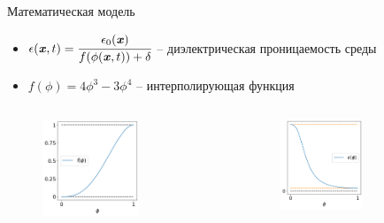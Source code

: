 \begin{frame}{Математическая модель}
\vspace{-0.2cm}
\begin{itemize}
	\item $\epsilon({\textbf{\textit{x}}}, t) = \cfrac{\epsilon_0({\textbf{\textit{x}}})}{f(\phi({\textbf{\textit{x}}}, t)) +
	\delta}$ -- диэлектрическая проницаемость среды
	\item $f(\phi) = 4 \phi^3 - 3 \phi^4$ -- интерполирующая функция
\end{itemize}
\begin{columns}
\begin{figure}
	\hspace*{1.4cm}
	\includegraphics[width=0.65\textwidth]{figures/f_form.png}
\end{figure}
\begin{figure}
	\hspace*{-2cm}
	\includegraphics[width=0.60\textwidth]{figures/eps_form.png}
\end{figure}
\end{columns}
\end{frame}


